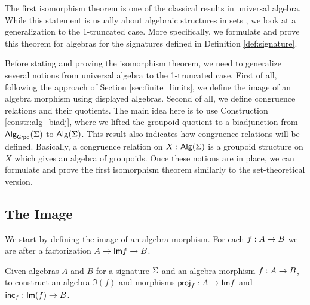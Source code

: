The first isomorphism theorem is one of the classical results in universal algebra.
While this statement is usually about algebraic structures in sets \cite{lynge2019}, we look at a generalization to the 1-truncated case.
More specifically, we formulate and prove this theorem for algebras for the signatures defined in Definition \ref{def:signature}.

Before stating and proving the isomorphism theorem, we need to generalize several notions from universal algebra to the 1-truncated case.
First of all, following the approach of Section \ref{sec:finite_limits}, we define the image of an algebra morphism using displayed algebras.
Second of all, we define congruence relations and their quotients.
The main idea here is to use Construction \ref{constr:alg_biadj}, where
we lifted the groupoid quotient to a biadjunction from $\mathsf{Alg}_{\mathsf{Grpd}}(\Sigma)$ to $\mathsf{Alg}(\Sigma)$.
This result also indicates how congruence relations will be defined.
Basically, a congruence relation on $X : \mathsf{Alg}(\Sigma)$ is a groupoid structure on $X$ which gives an algebra of groupoids.
Once these notions are in place, we can formulate and prove the first isomorphism theorem similarly to the set-theoretical version.

\subsection{The Image}
We start by defining the image of an algebra morphism.
For each $f : A \rightarrow B$ we are after a factorization $A \rightarrow \mathsf{Im}{f} \rightarrow B$.

\begin{problem}
\label{prob:image}
Given algebras $A$ and $B$ for a signature $\Sigma$ and an algebra morphism $f : A \rightarrow B$,
to construct an algebra $\Im(f)$ and morphisms $\mathsf{proj}_{f} : A \rightarrow \mathsf{Im}{f}$ and $\mathsf{inc}_{f} : \mathsf{Im}(f) \rightarrow B$. 
\end{problem}

